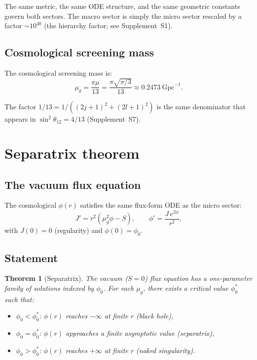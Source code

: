 \documentclass[11pt,letterpaper]{article}
\newtheorem{theorem}{Theorem}[section]
\numberwithin{equation}{section}
\begin{document}
The same metric, the same ODE structure, and the same geometric constants
govern both sectors. The macro sector is simply the micro sector rescaled
by a factor $\sim 10^{40}$ (the hierarchy factor; see Supplement~S1).

\subsection{Cosmological screening mass}

The cosmological screening mass is:
\begin{equation}
\label{eq:mu_g}
  \mu_g = \frac{\pi\mu}{13} = \frac{\pi\sqrt{\pi/3}}{13} \approx 0.2473~\mathrm{Gpc}^{-1}.
\end{equation}

The factor $1/13 = 1/((2j+1)^2 + (2l+1)^2)$ is the same denominator that
appears in $\sin^2\theta_{12} = 4/13$ (Supplement~S7).

\section{Separatrix theorem}
\label{sec:separatrix}

\subsection{The vacuum flux equation}

The cosmological $\phi(r)$ satisfies the same flux-form ODE as the micro
sector:
\begin{equation}
\label{eq:flux_cosmo}
  J' = r^2(\mu_g^2\phi - S), \qquad \phi' = \frac{J\,e^{2\phi}}{r^2},
\end{equation}
with $J(0) = 0$ (regularity) and $\phi(0) = \phi_0$.

\subsection{Statement}

\begin{theorem}[Separatrix]
\label{thm:separatrix}
The vacuum ($S = 0$) flux equation has a one-parameter family of solutions
indexed by $\phi_0$. For each $\mu_g$, there exists a critical value
$\phi_0^*$ such that:
\begin{itemize}
  \item $\phi_0 < \phi_0^*$: $\phi(r)$ reaches $-\infty$ at finite $r$
    (black hole),
  \item $\phi_0 = \phi_0^*$: $\phi(r)$ approaches a finite asymptotic value
    (separatrix),
  \item $\phi_0 > \phi_0^*$: $\phi(r)$ reaches $+\infty$ at finite $r$
    (naked singularity).
\end{itemize}
\end{theorem}
\end{document}
